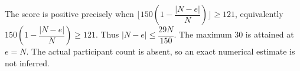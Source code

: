 The score is positive precisely when $\lfloor150(1-\dfrac{|N-e|}{N})\rfloor\ge121$, equivalently $150(1-\dfrac{|N-e|}{N})\ge121$. Thus $\boxed{|N-e|\le\dfrac{29N}{150}}$. The maximum 30 is attained at $e=N$. The actual participant count is absent, so an exact numerical estimate is not inferred.

